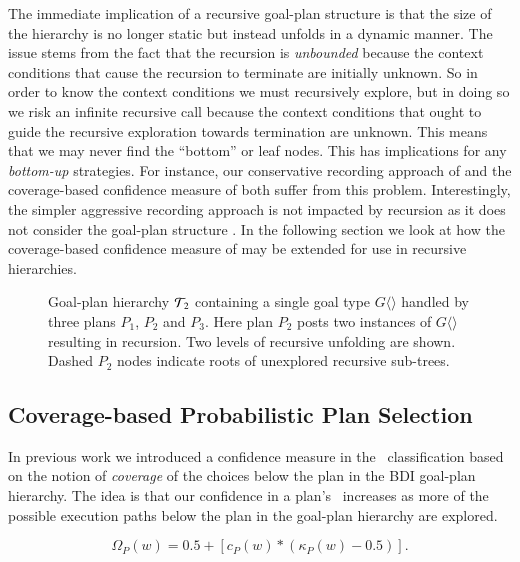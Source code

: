 The immediate implication of a recursive goal-plan structure is that the size of the hierarchy is no longer static but instead unfolds in a dynamic manner. The issue stems from the fact that the recursion is \textit{unbounded} because the context conditions that cause the recursion to terminate are initially unknown. So in order to know the context conditions we must recursively explore, but in doing so we risk an infinite recursive call because the context conditions that ought to guide the recursive exploration towards termination are unknown. This means that we may never find the ``bottom'' or leaf nodes. This has implications for any \textit{bottom-up} strategies. For instance, our conservative recording approach of \cite{Airiau:IJAT:09} and the coverage-based confidence measure of \cite{Singh:AAMAS10} both suffer from this problem. Interestingly, the simpler aggressive recording approach is not impacted by recursion as it does not consider the goal-plan structure . In the following section we look at how the coverage-based confidence measure of \cite{Singh:AAMAS10} may be extended for use in recursive hierarchies.

\begin{figure}[t]
\begin{center}
\resizebox{0.8\textwidth}{!}{

}
\end{center}
\caption{Goal-plan hierarchy ${\mathcal{T}}_2$ containing a single goal type $G\langle\rangle$ handled by three plans $P_1$, $P_2$ and $P_3$. Here plan $P_2$ posts two instances of $G\langle\rangle$ resulting in recursion. Two levels of recursive unfolding are shown. Dashed $P_2$ nodes indicate roots of unexplored recursive sub-trees.}
\label{fig:unfolding}
\end{figure}

\subsection{Coverage-based Probabilistic Plan Selection}

In previous work \cite{Singh:AAMAS10} we introduced a confidence measure in the \dt\ classification based on the notion of \textit{coverage} of the choices below the plan in the BDI goal-plan hierarchy. The idea is that our confidence in a plan's \dt\ increases as more of the possible execution paths below the plan in the goal-plan hierarchy are explored.

\begin{equation*}\label{eqn:coverage}   
\Omega_P(w) = 0.5 + \left[  c_P(w) *  \left( \kappa_P(w) - 0.5 \right)  \right].
\end{equation*}


